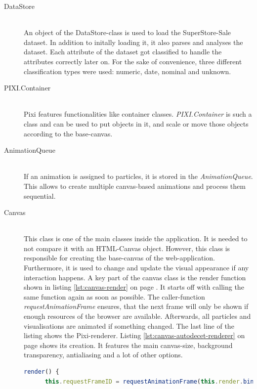 \begin{description}
\item[DataStore] \hfill \\
An object of the DataStore-class is used to load the SuperStore-Sale dataset. In addition to initally loading it, it also parses and analyses the dataset. Each attribute of the dataset got classified to handle the attributes correctly later on. For the sake of convenience, three different classification types were used: numeric, date, nominal and unknown.

\item[PIXI.Container] \hfill \\
\ac{Pixi} features functionalities like container classes. \textit{PIXI.Container} is such a class and can be used to put objects in it, and scale or move those objects according to the base-canvas.

\item[AnimationQueue] \hfill \\
If an animation is assigned to particles, it is stored in the \textit{AnimationQueue}. This allows to create multiple canvas-based animations and process them sequential.

\item[Canvas] \hfill \\
This class is one of the main classes inside the application. It is needed to not compare it with an HTML-Canvas object. However, this class is responsible for creating the base-canvas of the web-application. Furthermore, it is used to change and update the visual appearance if any interaction happens. A key part of the canvas class is the render function shown in listing \ref{lst:canvas-render} on page \pageref{lst:canvas-render}. It starts off with calling the same function again as soon as possible. The caller-function \textit{requestAnimationFrame} ensures, that the next frame will only be shown if enough resources of the browser are available. Afterwards, all particles and visualisations are animated if something changed. The last line of the listing shows the \ac{Pixi}-renderer. Listing \ref{lst:canvas-autodecet-renderer} on page \pageref{lst:canvas-autodecet-renderer} shows its creation. It features the main canvas-size, background transparency, antialiasing and a lot of other options.

\begin{lstlisting}[language=JavaScript, caption={Render function of the canvas class.}, label={lst:canvas-render}]
    render() {
      this.requestFrameID = requestAnimationFrame(this.render.bind(this));


\end{lstlisting}
\end{description}
